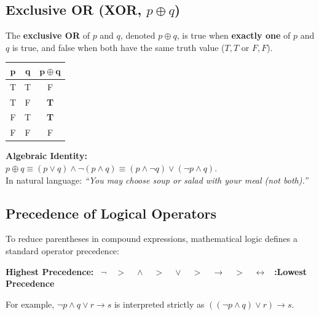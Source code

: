 \documentclass[11pt,a4paper]{article}
\begin{document}
\subsection{Exclusive OR (XOR, \texorpdfstring{$p \oplus q$}{p xor q})}
\begin{defbox}[Exclusive OR]
The \textbf{exclusive OR} of $p$ and $q$, denoted $p \oplus q$, is true when \textbf{exactly one} of $p$ and $q$ is true, and false when both have the same truth value ($T,T$ or $F,F$).
\end{defbox}

\begin{center}
\renewcommand{\arraystretch}{1.2}
\begin{tabular}{|c|c|c|}
\hline
\rowcolor{navy!15} $\mathbf{p}$ & $\mathbf{q}$ & $\mathbf{p \oplus q}$ \\
\hline
T & T & F \\
T & F & \textbf{T} \\
F & T & \textbf{T} \\
F & F & F \\
\hline
\end{tabular}
\quad
\begin{minipage}{0.65\textwidth}
\small
\textbf{Algebraic Identity:}\\
$p \oplus q \equiv (p \vee q) \wedge \neg(p \wedge q) \equiv (p \wedge \neg q) \vee (\neg p \wedge q)$.\\
In natural language: \textit{``You may choose soup or salad with your meal (not both).''}
\end{minipage}
\end{center}

\subsection{Precedence of Logical Operators}
To reduce parentheses in compound expressions, mathematical logic defines a standard operator precedence:
\begin{center}
\textbf{Highest Precedence:} \ $\neg \quad > \quad \wedge \quad > \quad \vee \quad > \quad \rightarrow \quad > \quad \leftrightarrow$ \ \textbf{:Lowest Precedence}
\end{center}
For example, $\neg p \wedge q \vee r \rightarrow s$ is interpreted strictly as $((\neg p \wedge q) \vee r) \rightarrow s$.
\end{document}
